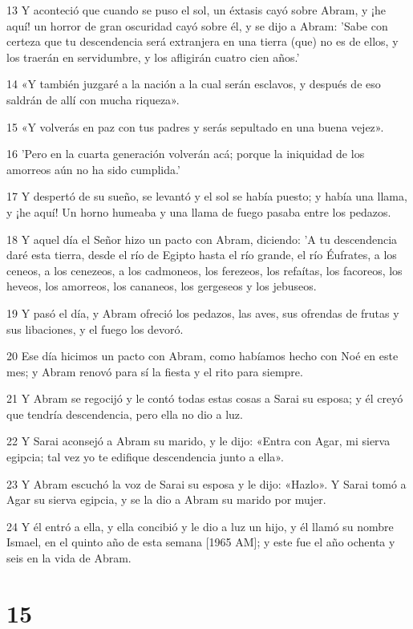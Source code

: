 \par 13 Y aconteció que cuando se puso el sol, un éxtasis cayó sobre Abram, y ¡he aquí! un horror de gran oscuridad cayó sobre él, y se dijo a Abram: 'Sabe con certeza que tu descendencia será extranjera en una tierra (que) no es de ellos, y los traerán en servidumbre, y los afligirán cuatro cien años.'
\par 14 «Y también juzgaré a la nación a la cual serán esclavos, y después de eso saldrán de allí con mucha riqueza».
\par 15 «Y volverás en paz con tus padres y serás sepultado en una buena vejez».
\par 16 'Pero en la cuarta generación volverán acá; porque la iniquidad de los amorreos aún no ha sido cumplida.'
\par 17 Y despertó de su sueño, se levantó y el sol se había puesto; y había una llama, y ​​¡he aquí! Un horno humeaba y una llama de fuego pasaba entre los pedazos.
\par 18 Y aquel día el Señor hizo un pacto con Abram, diciendo: 'A tu descendencia daré esta tierra, desde el río de Egipto hasta el río grande, el río Éufrates, a los ceneos, a los cenezeos, a los cadmoneos, los ferezeos, los refaítas, los facoreos, los heveos, los amorreos, los cananeos, los gergeseos y los jebuseos.
\par 19 Y pasó el día, y Abram ofreció los pedazos, las aves, sus ofrendas de frutas y sus libaciones, y el fuego los devoró.
\par 20 Ese día hicimos un pacto con Abram, como habíamos hecho con Noé en este mes; y Abram renovó para sí la fiesta y el rito para siempre.
\par 21 Y Abram se regocijó y le contó todas estas cosas a Sarai su esposa; y él creyó que tendría descendencia, pero ella no dio a luz.
\par 22 Y Sarai aconsejó a Abram su marido, y le dijo: «Entra con Agar, mi sierva egipcia; tal vez yo te edifique descendencia junto a ella».
\par 23 Y Abram escuchó la voz de Sarai su esposa y le dijo: «Hazlo». Y Sarai tomó a Agar su sierva egipcia, y se la dio a Abram su marido por mujer.
\par 24 Y él entró a ella, y ella concibió y le dio a luz un hijo, y él llamó su nombre Ismael, en el quinto año de esta semana [1965 AM]; y este fue el año ochenta y seis en la vida de Abram.

\chapter{15}

